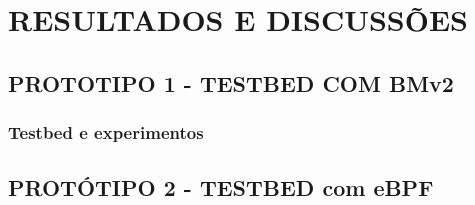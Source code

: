 \chapter{RESULTADOS E DISCUSSÕES}
\section{PROTOTIPO 1 - TESTBED COM BMv2}
\subsection{Testbed e experimentos}
\section{PROTÓTIPO 2 - TESTBED com eBPF}